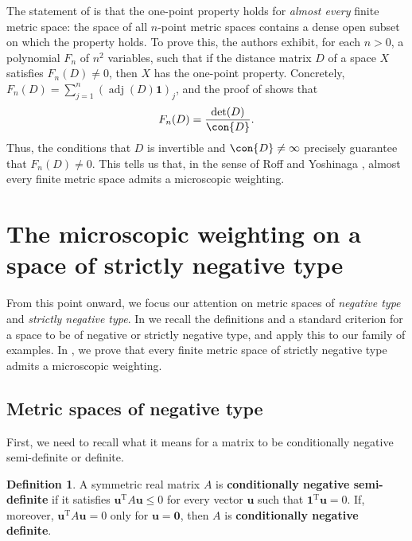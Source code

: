 \documentclass[a4paper, oneside, reqno]{amsart}
\theoremstyle{definition}
\newtheorem{definition}[theorem]{Definition}
\theoremstyle{remark}
\numberwithin{equation}{section}
\DeclareMathOperator{\adj}{adj}
\renewcommand{\vec}{\mathbf}
\newcommand{\onevector}{\mathbf{1}}
\newcommand{\transpose}{\mathrm{T}}
\newcommand{\define}{\textbf}
\begin{document}
The statement of \cite[Theorem 2.3]{RoffYoshinaga} is that the one-point property holds for \emph{almost every} finite metric space: the space of all \(n\)-point metric spaces contains a dense open subset on which the property holds. To prove this, the authors exhibit, for each \(n > 0\), a polynomial \(F_n\) of \(n^2\) variables, such that if the distance matrix \(D\) of a space \(X\) satisfies \(F_n(D) \neq 0\), then \(X\) has the one-point property. Concretely, \(F_n(D) = \sum_{j=1}^n (\adj(D)\onevector)_j\), and the proof of  shows that
    \[
    F_n(D) = \frac{\det(D)}{\con{D}}.
    \]
Thus, the conditions that \(D\) is invertible and \(\con{D} \neq \infty\) precisely guarantee that \(F_n(D) \neq 0\). This tells us that, in the sense of Roff and Yoshinaga \cite{RoffYoshinaga}, almost every finite metric space admits a microscopic weighting.


\section{The microscopic weighting on a space of strictly negative type}
\label{sec:negative_type}

From this point onward, we focus our attention on metric spaces of \emph{negative type} and \emph{strictly negative type}. In  we recall the definitions and a standard criterion for a space to be of negative or strictly negative type, and apply this to our family of examples. In , we prove that every finite metric space of strictly negative type admits a microscopic weighting.


\subsection{Metric spaces of negative type}
\label{sec:negative_type_spaces}

First, we need to recall what it means for a matrix to be conditionally negative semi-definite or definite.

\begin{definition}
\label{def:cond-neg-semi-def}
A symmetric real matrix \(A\) is \define{conditionally negative semi-definite} if it satisfies \(\vec{u}^\transpose A \vec{u} \leq 0\) for every vector \(\vec{u}\) such that \(\onevector^\transpose \vec{u} = 0\). If, moreover, \(\vec{u}^\transpose A \vec{u} = 0\) only for \(\vec{u} = \vec{0}\), then \(A\) is \define{conditionally negative definite}.
\end{definition}
\end{document}
